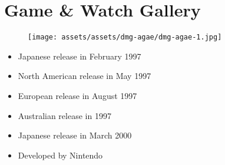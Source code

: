 \documentclass{book}
\begin{document}
\begingroup \chapter*{Game \& Watch Gallery} \endgroup
\begin{figure}[H]
\vskip 4pt
\centering
\texttt{[image: assets/assets/dmg-agae/dmg-agae-1.jpg]}\end{figure}
\begin{itemize} [nosep]




\item Japanese release in February 1997







\item North American release in May 1997







\item European release in August 1997







\item Australian release in 1997







\item Japanese release in March 2000
































\item Developed by Nintendo

\end{itemize}\noindent
\end{document}
